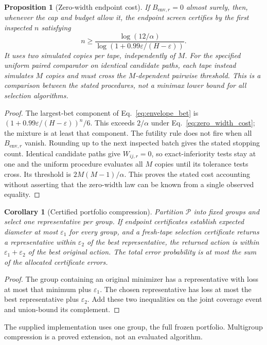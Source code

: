 \documentclass[preprint,11pt,sort&compress]{elsarticle}
\newtheorem{proposition}[theorem]{Proposition}
\newtheorem{corollary}[theorem]{Corollary}
\begin{document}
\begin{proposition}[Zero-width endpoint cost]
\label{prop:zero_width_cost}
If $B_{\mathrm{env},r}=0$ almost surely, then, whenever the cap and budget allow it, the
endpoint screen certifies by the first inspected $n$ satisfying
\begin{equation}
 n\ge\frac{\log(12/\alpha)}
 {\log(1+0.99\varepsilon/(H-\varepsilon))}.
 \label{eq:zero_width_cost}
\end{equation}
It uses two simulated copies per tape, independently of $M$. For the
specified uniform paired comparator on identical candidate paths, each
tape instead simulates $M$ copies and must cross the $M$-dependent
pairwise threshold. This is a comparison between the stated procedures,
not a minimax lower bound for all selection algorithms.
\end{proposition}
\begin{proof}
The largest-bet component of Eq.~\ref{eq:envelope_bet} is
$(1+0.99\varepsilon/(H-\varepsilon))^n/6$. This exceeds $2/\alpha$
under Eq.~\ref{eq:zero_width_cost}; the mixture is at least that component.
The futility rule does not fire when all $B_{\mathrm{env},r}$ vanish. Rounding up to the
next inspected batch gives the stated stopping count. Identical candidate
paths give $W_{ij,r}=0$, so exact-inferiority tests stay at one and the
uniform procedure evaluates all $M$ copies until its tolerance tests
cross. Its threshold is $2M(M-1)/\alpha$. This proves the stated cost
accounting without asserting that the zero-width law can be known from
a single observed equality.
\end{proof}

\begin{corollary}[Certified portfolio compression]
Partition $\mathcal P$ into fixed groups and select one representative per
group. If endpoint certificates establish expected diameter at most
$\varepsilon_1$ for every group, and a fresh-tape selection certificate
returns a representative within $\varepsilon_2$ of the best representative,
the returned action is within $\varepsilon_1+\varepsilon_2$ of the best
original action. The total error probability is at most the sum of the
allocated certificate errors.
\end{corollary}
\begin{proof}
The group containing an original minimizer has a representative with loss
at most that minimum plus $\varepsilon_1$. The chosen representative has
loss at most the best representative plus $\varepsilon_2$. Add these two
inequalities on the joint coverage event and union-bound its complement.
\end{proof}
The supplied implementation uses one group, the full frozen portfolio.
Multigroup compression is a proved extension, not an evaluated algorithm.
\end{document}
